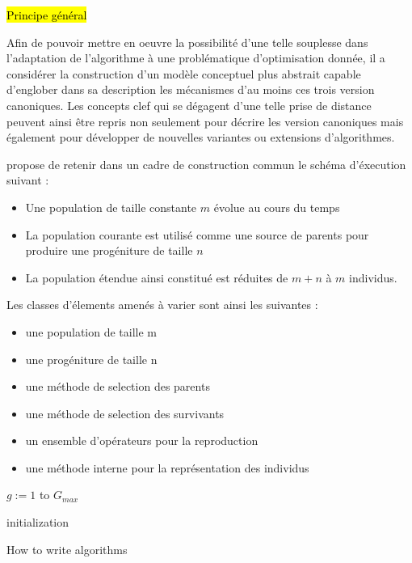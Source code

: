\hl{Principe général}

Afin de pouvoir mettre en oeuvre la possibilité d'une telle souplesse dans l'adaptation de l'algorithme à une problématique d'optimisation donnée, il a considérer la construction d'un modèle conceptuel plus abstrait capable d'englober dans sa description les mécanismes d'au moins ces trois version canoniques. Les concepts clef qui se dégagent d'une telle prise de distance peuvent ainsi être repris non seulement pour décrire les version canoniques mais également pour développer de nouvelles variantes ou extensions d'algorithmes.

\textcite{DeJong2006a} propose de retenir dans un cadre de construction commun le schéma d'éxecution suivant : 

\begin{itemize}
\item Une population de taille constante $m$ évolue au cours du temps
\item La population courante est utilisé comme une source de parents pour produire une progéniture de taille $n$
\item La population étendue ainsi constitué est réduites de $m + n$ à $m$ individus.
\end{itemize}

Les classes d'élements amenés à varier sont ainsi les suivantes : 

\begin{itemize}
\item une population de taille m
\item une progéniture de taille n
\item une méthode de selection des parents
\item une méthode de selection des survivants
\item un ensemble d'opérateurs pour la reproduction
\item une méthode interne pour la représentation des individus
\end{itemize}

$g := 1$ to $G_{max}$

\begin{algorithm}[H]
 initialization\;
 \caption{How to write algorithms}
\end{algorithm}

